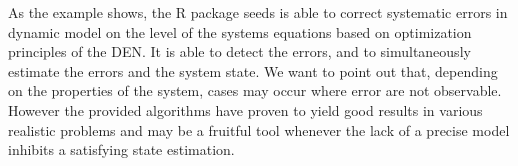 As the example shows, the R package \textsf{seeds} is able to correct systematic errors in 
dynamic model on the level of the systems equations based on optimization principles of the 
DEN. It is able to detect the errors, and to simultaneously estimate the errors and the 
system state. We want to point out that, depending on the properties of the system, cases 
may occur where error are not observable. However the provided algorithms have proven to 
yield good results in various realistic problems and may be a fruitful tool whenever the lack of 
a precise model inhibits a satisfying state estimation.